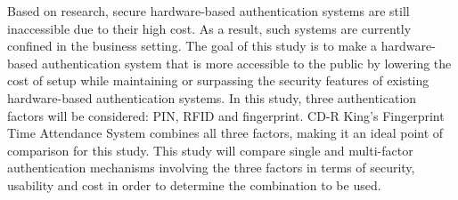 Based on research, secure hardware-based authentication systems are still inaccessible due to their high cost. As a result, such systems are currently confined in the business setting. The goal of this study is to make a hardware-based authentication system that is more accessible to the public by lowering the cost of setup while maintaining or surpassing the security features of existing hardware-based authentication systems. In this study, three authentication factors will be considered: PIN, RFID and fingerprint. CD-R King's Fingerprint Time Attendance System combines all three factors, making it an ideal point of comparison for this study. This study will compare single and multi-factor authentication mechanisms involving the three factors in terms of security, usability and cost in order to determine the combination to be used.